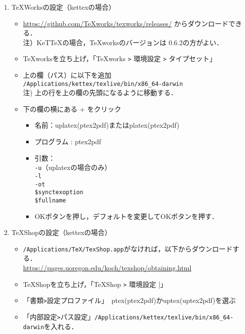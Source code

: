 \documentclass{ujarticle}
\begin{document}
\begin{enumerate}[\bf\large 1.]
\item TeXWorksの設定（kettexの場合）
  \begin{itemize}
  \item \url{https://github.com/TeXworks/texworks/releases/} からダウンロードできる．\\
\hspace*{10mm}注）KeTTeXの場合，TeXworksのバージョンは 0.6.2の方がよい．
  \item TeXworksを立ち上げ，「TeXworks \verb|>| 環境設定 \verb|>| タイプセット」
  \item 上の欄（パス）に以下を追加\\
  \hspace*{5mm}\verb|/Applications/kettex/texlive/bin/x86_64-darwin|\\
  \hspace*{10mm}注) 上の行を上の欄の先頭になるように移動する．
  \item 下の欄の横にある + をクリック
    \begin{itemize}
    \item 名前：uplatex(ptex2pdf)またはplatex(ptex2pdf)
    \item プログラム : ptex2pdf
    \item 引数：\\
    \hspace*{10mm} \verb|-u|（uplatexの場合のみ）\\
    \hspace*{10mm} \verb|-l|\\
    \hspace*{10mm} \verb|-ot|\\
    \hspace*{10mm}  \verb|$synctexoption|\\
    \hspace*{10mm}  \verb|$fullname|
    \item[]OKボタンを押し，デフォルトを変更してOKボタンを押す．
    \end{itemize}
  \end{itemize}

\item TeXShopの設定（kettexの場合）
  \begin{itemize}
  \item \verb|/Applications/TeX/TexShop.app|がなければ，以下からダウンロードする．\\
  \hspace*{5mm}\url{https://pages.uoregon.edu/koch/texshop/obtaining.html}
  \item TeXShopを立ち上げ，「TeXShop \verb|>| 環境設定 |」
  \item 「書類\verb|>|設定プロファイル」　ptex(ptex2pdf)かuptex(uptex2pdf)を選ぶ
  \item 「内部設定\verb|>|パス設定」\verb|/Applications/kettex/texlive/bin/x86_64-darwin|を入れる．
  \end{itemize}


\end{enumerate}
\end{document}
